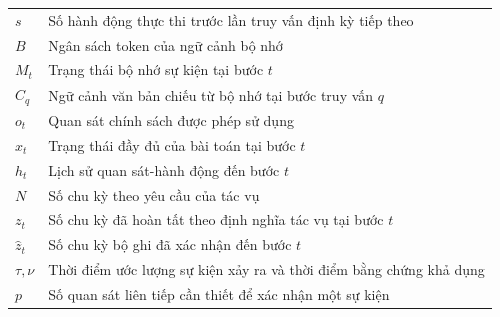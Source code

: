 \documentclass[fontsize=13pt,paper=a4,DIV=calc,oneside,open=any,headings=normal,numbers=noenddot]{scrbook}
\begin{document}
\begin{longtable}{p{}p{}}
$s$ & Số hành động thực thi trước lần truy vấn định kỳ tiếp theo\\
$B$ & Ngân sách token của ngữ cảnh bộ nhớ\\
$M_t$ & Trạng thái bộ nhớ sự kiện tại bước $t$\\
$C_q$ & Ngữ cảnh văn bản chiếu từ bộ nhớ tại bước truy vấn $q$\\
$o_t$ & Quan sát chính sách được phép sử dụng\\
$x_t$ & Trạng thái đầy đủ của bài toán tại bước $t$\\
$h_t$ & Lịch sử quan sát-hành động đến bước $t$\\
$N$ & Số chu kỳ theo yêu cầu của tác vụ\\
$z_t$ & Số chu kỳ đã hoàn tất theo định nghĩa tác vụ tại bước $t$\\
$\hat z_t$ & Số chu kỳ bộ ghi đã xác nhận đến bước $t$\\
$\tau,\nu$ & Thời điểm ước lượng sự kiện xảy ra và thời điểm bằng chứng khả dụng\\
$p$ & Số quan sát liên tiếp cần thiết để xác nhận một sự kiện\\
\end{longtable}
\mainmatter





\cleardoublepage
{}
{}


\end{document}
